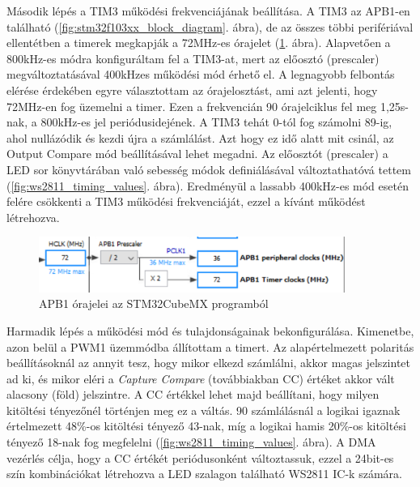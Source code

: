 \documentclass[../main.tex]{subfiles}
\begin{document}
            
            Második lépés a TIM3 működési frekvenciájának beállítása. A TIM3 az APB1-en található (\ref{fig:stm32f103xx_block_diagram}. ábra), de az összes többi perifériával ellentétben a timerek megkapják a 72MHz-es órajelet (\ref{fig:tim3_clk_src}. ábra). Alapvetően a 800kHz-es módra konfiguráltam fel a TIM3-at, mert az előosztó (prescaler) megváltoztatásával 400kHzes működési mód érhető el.
            A legnagyobb felbontás elérése érdekében egyre választottam az órajelosztást, ami azt jelenti, hogy 72MHz-en fog üzemelni a timer. Ezen a frekvencián 90 órajelciklus fel meg 1,25\micro s-nak, a 800kHz-es jel periódusidejének. A TIM3 tehát 0-tól fog számolni 89-ig, ahol nullázódik és kezdi újra a számlálást. Azt hogy ez idő alatt mit csinál, az Output Compare mód beállításával lehet megadni.
            Az előosztót (prescaler) a LED sor könyvtárában való sebesség módok definiálásával változtathatóvá tettem (\ref{fig:ws2811_timing_values}. ábra). Eredményül a lassabb 400kHz-es mód esetén felére csökkenti a TIM3 működési frekvenciáját, ezzel a kívánt működést létrehozva.
            
            \begin{figure}[h!]
                \centering
                    \includegraphics[width=10cm]{mbed_res/tim3_clock_src}
                \caption{APB1 órajelei az STM32CubeMX programból}
                \label{fig:tim3_clk_src}
            \end{figure}
            
            Harmadik lépés a működési mód és tulajdonságainak bekonfigurálása. Kimenetbe, azon belül a PWM1 üzemmódba állítottam a timert. Az alapértelmezett polaritás beállításoknál az annyit tesz, hogy mikor elkezd számlálni, akkor magas jelszintet ad ki, és mikor eléri a \textit{Capture Compare} (továbbiakban CC) értéket akkor vált alacsony (föld) jelszintre. A CC értékkel lehet majd beállítani, hogy milyen kitöltési tényezőnél történjen meg ez a váltás. 90 számlálásnál a logikai igaznak értelmezett 48\%-os kitöltési tényező 43-nak, míg a logikai hamis 20\%-os kitöltési tényező 18-nak fog megfelelni (\ref{fig:ws2811_timing_values}. ábra). A DMA vezérlés célja, hogy a CC értékét periódusonként változtassuk, ezzel a 24bit-es szín kombinációkat létrehozva a LED szalagon található WS2811 IC-k számára.
            
\end{document}
